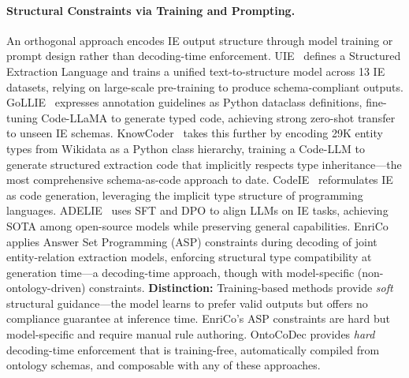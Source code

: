 \paragraph{Structural Constraints via Training and Prompting.}
An orthogonal approach encodes IE output structure through model training or prompt design rather than decoding-time enforcement.
%
UIE~\cite{lu2022uie} defines a Structured Extraction Language and trains a unified text-to-structure model across 13 IE datasets, relying on large-scale pre-training to produce schema-compliant outputs.
%
GoLLIE~\cite{sainz2024gollie} expresses annotation guidelines as Python dataclass definitions, fine-tuning Code-LLaMA to generate typed code, achieving strong zero-shot transfer to unseen IE schemas.
%
KnowCoder~\cite{knowcoder_acl2024} takes this further by encoding 29K entity types from Wikidata as a Python class hierarchy, training a Code-LLM to generate structured extraction code that implicitly respects type inheritance---the most comprehensive schema-as-code approach to date.
%
CodeIE~\cite{li2023codeie} reformulates IE as code generation, leveraging the implicit type structure of programming languages.
%
ADELIE~\cite{qi2024adelie} uses SFT and DPO to align LLMs on IE tasks, achieving SOTA among open-source models while preserving general capabilities.
%
EnriCo~\cite{zaratiana2024enrico} applies Answer Set Programming (ASP) constraints during decoding of joint entity-relation extraction models, enforcing structural type compatibility at generation time---a decoding-time approach, though with model-specific (non-ontology-driven) constraints.
%
\textbf{Distinction:} Training-based methods provide \emph{soft} structural guidance---the model learns to prefer valid outputs but offers no compliance guarantee at inference time. EnriCo's ASP constraints are hard but model-specific and require manual rule authoring. OntoCoDec provides \emph{hard} decoding-time enforcement that is training-free, automatically compiled from ontology schemas, and composable with any of these approaches.


